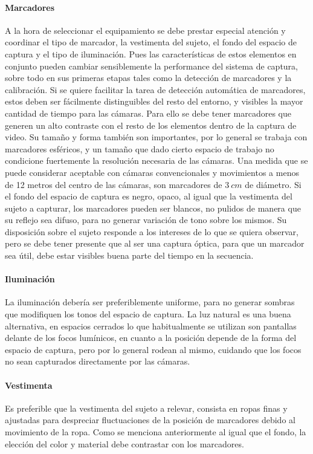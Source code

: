 \paragraph{Marcadores}
A la hora de seleccionar el equipamiento se debe prestar especial atención y coordinar el tipo de marcador, la vestimenta del sujeto, el fondo del espacio de captura y el tipo de iluminación. Pues las características de estos elementos en conjunto pueden cambiar sensiblemente la performance del sistema de captura, sobre todo en sus primeras etapas tales como la detección de marcadores y la  calibración.
Si se quiere facilitar la tarea de detección automática de marcadores, estos deben ser fácilmente distinguibles del resto del entorno, y visibles la mayor cantidad de tiempo para las cámaras. Para ello se debe tener marcadores que generen un alto contraste con el resto de los elementos dentro de la captura de video. 
Su tamaño y forma también son importantes, por lo general se trabaja con marcadores esféricos, y un tamaño que dado cierto espacio de trabajo no condicione fuertemente la resolución necesaria de las cámaras. Una medida que se puede considerar aceptable con cámaras convencionales y movimientos a menos de 12 metros del centro de las cámaras, son marcadores de $3~cm$ de diámetro.  
Si el fondo del espacio de captura es negro, opaco, al igual que la vestimenta del sujeto a capturar, los marcadores pueden ser blancos, no pulidos de manera que su reflejo sea difuso, para no generar variación de tono sobre los mismos. 
Su disposición sobre el sujeto responde a los intereses de lo que se quiera observar, pero se debe tener presente que al ser una captura óptica, para que un marcador sea útil, debe estar visibles buena parte del tiempo en la secuencia.

\paragraph{Iluminación}
La iluminación debería ser preferiblemente uniforme, para no generar sombras que modifiquen los tonos del espacio de captura. La luz natural es una buena alternativa, en espacios cerrados lo que habitualmente se utilizan son pantallas delante de los focos lumínicos, en cuanto a la posición depende de la forma del espacio de captura, pero por lo general rodean al mismo, cuidando que los focos no sean capturados  directamente por las cámaras.

\paragraph{Vestimenta}
Es preferible que la vestimenta del sujeto a relevar, consista en ropas finas y ajustadas para despreciar fluctuaciones de la posición de marcadores debido al movimiento de la ropa. Como se menciona anteriormente al igual que el fondo, la elección del color y material debe contrastar con los marcadores.

